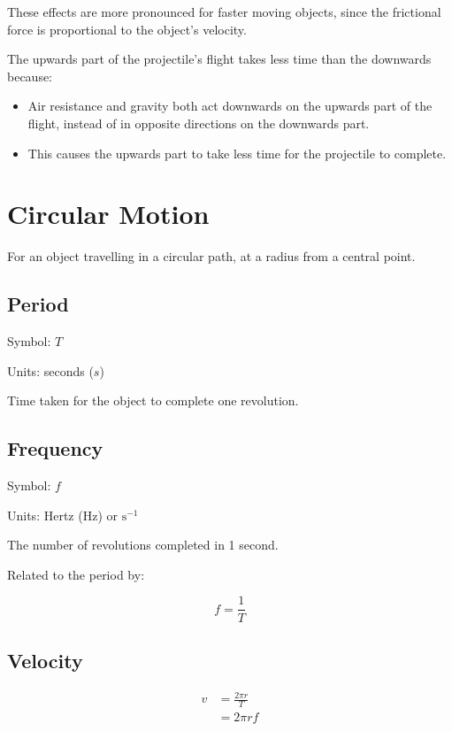 \documentclass[a4paper,11pt]{report}
\begin{document}
These effects are more pronounced for faster moving objects, since the
frictional force is proportional to the object's velocity.

The upwards part of the projectile's flight takes less time than the downwards
because:

\begin{itemize}
\item Air resistance and gravity both act downwards on the upwards part of the
	flight, instead of in opposite directions on the downwards part.
\item This causes the upwards part to take less time for the projectile to
	complete.
\end{itemize}


\section{Circular Motion}

For an object travelling in a circular path, at a radius from a central point.

\subsection{Period}

Symbol: $T$

Units: seconds ($s$)

Time taken for the object to complete one revolution.

\subsection{Frequency}

Symbol: $f$

Units: Hertz (Hz) or $\mbox{s}^{-1}$

The number of revolutions completed in 1 second.

Related to the period by:

$$
f = \frac{1}{T}
$$

\subsection{Velocity}

$$
\begin{aligned}
v & = \frac{2\pi r}{T} \\
& = 2\pi r f \\
\end{aligned}
$$
\end{document}
